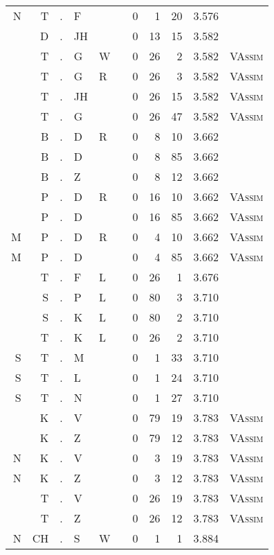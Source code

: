 \begin{longtable}{r@{ } r@{ } c@{ } l@{ } l@{ } l@{ } r r r r l }
N & T & . & F &   &   & 0 & 1 & 20 & 3.576 &  \\
  & D & . & JH &   &   & 0 & 13 & 15 & 3.582 &  \\
  & T & . & G & W &   & 0 & 26 & 2 & 3.582 & \textsc{VAssim} \\
  & T & . & G & R &   & 0 & 26 & 3 & 3.582 & \textsc{VAssim} \\
  & T & . & JH &   &   & 0 & 26 & 15 & 3.582 & \textsc{VAssim} \\
  & T & . & G &   &   & 0 & 26 & 47 & 3.582 & \textsc{VAssim} \\
  & B & . & D & R &   & 0 & 8 & 10 & 3.662 &  \\
  & B & . & D &   &   & 0 & 8 & 85 & 3.662 &  \\
  & B & . & Z &   &   & 0 & 8 & 12 & 3.662 &  \\
  & P & . & D & R &   & 0 & 16 & 10 & 3.662 & \textsc{VAssim} \\
  & P & . & D &   &   & 0 & 16 & 85 & 3.662 & \textsc{VAssim} \\
M & P & . & D & R &   & 0 & 4 & 10 & 3.662 & \textsc{VAssim} \\
M & P & . & D &   &   & 0 & 4 & 85 & 3.662 & \textsc{VAssim} \\
  & T & . & F & L &   & 0 & 26 & 1 & 3.676 &  \\
  & S & . & P & L &   & 0 & 80 & 3 & 3.710 &  \\
  & S & . & K & L &   & 0 & 80 & 2 & 3.710 &  \\
  & T & . & K & L &   & 0 & 26 & 2 & 3.710 &  \\
S & T & . & M &   &   & 0 & 1 & 33 & 3.710 &  \\
S & T & . & L &   &   & 0 & 1 & 24 & 3.710 &  \\
S & T & . & N &   &   & 0 & 1 & 27 & 3.710 &  \\
  & K & . & V &   &   & 0 & 79 & 19 & 3.783 & \textsc{VAssim} \\
  & K & . & Z &   &   & 0 & 79 & 12 & 3.783 & \textsc{VAssim} \\
N & K & . & V &   &   & 0 & 3 & 19 & 3.783 & \textsc{VAssim} \\
N & K & . & Z &   &   & 0 & 3 & 12 & 3.783 & \textsc{VAssim} \\
  & T & . & V &   &   & 0 & 26 & 19 & 3.783 & \textsc{VAssim} \\
  & T & . & Z &   &   & 0 & 26 & 12 & 3.783 & \textsc{VAssim} \\
N & CH & . & S & W &   & 0 & 1 & 1 & 3.884 &  \\

\end{longtable}
